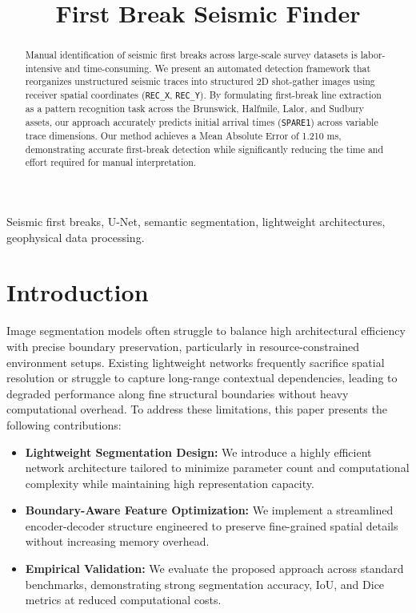 \documentclass[conference]{IEEEtran}
\begin{document}
\title{First Break Seismic Finder}

\author{
}

\maketitle

\begin{abstract}
Manual identification of seismic first breaks across large-scale survey datasets is labor-intensive and time-consuming. We present an automated detection framework that reorganizes unstructured seismic traces into structured 2D shot-gather images using receiver spatial coordinates (\texttt{REC\_X}, \texttt{REC\_Y}). By formulating first-break line extraction as a pattern recognition task across the Brunswick, Halfmile, Lalor, and Sudbury assets, our approach accurately predicts initial arrival times (\texttt{SPARE1}) across variable trace dimensions. Our method achieves a Mean Absolute Error of 1.210 ms, demonstrating accurate first-break detection while significantly reducing the time and effort required for manual interpretation.
\end{abstract}

\begin{IEEEkeywords}
Seismic first breaks, U-Net, semantic segmentation, lightweight architectures, geophysical data processing.
\end{IEEEkeywords}

\section{Introduction}
Image segmentation models often struggle to balance high architectural efficiency with precise boundary preservation, particularly in resource-constrained environment setups. Existing lightweight networks frequently sacrifice spatial resolution or struggle to capture long-range contextual dependencies, leading to degraded performance along fine structural boundaries without heavy computational overhead. To address these limitations, this paper presents the following contributions:

\begin{itemize}
    \item \textbf{Lightweight Segmentation Design:} We introduce a highly efficient network architecture tailored to minimize parameter count and computational complexity while maintaining high representation capacity.
    \item \textbf{Boundary-Aware Feature Optimization:} We implement a streamlined encoder-decoder structure engineered to preserve fine-grained spatial details without increasing memory overhead.
    \item \textbf{Empirical Validation:} We evaluate the proposed approach across standard benchmarks, demonstrating strong segmentation accuracy, IoU, and Dice metrics at reduced computational costs.
\end{itemize}
\end{document}
